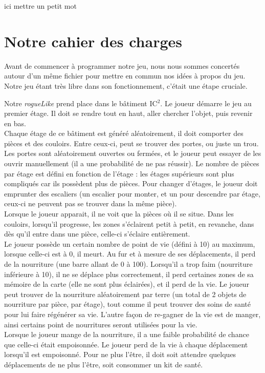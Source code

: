 \documentclass[11pt]{report}
\begin{document}
ici mettre un petit mot

	\section{Notre cahier des charges}

	Avant de commencer à programmer notre jeu, nous nous sommes concertés autour d'un même fichier pour mettre en commun nos idées à propos du jeu. Notre jeu étant très libre dans son fonctionnement, c'était une étape cruciale.
	
		\vspace{12pt}

	Notre \emph{rogueLike} prend place dans le bâtiment IC$^2$. Le joueur démarre le jeu au premier étage. Il doit se rendre tout en haut, aller chercher l'objet, puis revenir en bas.\\
	Chaque étage de ce bâtiment est généré aléatoirement, il doit comporter des pièces et des couloirs. Entre ceux-ci, peut se trouver des portes, ou juste un trou. Les portes sont aléatoirement ouvertes ou fermées, et le joueur peut essayer de les ouvrir manuellement (il a une probabilité de ne pas réussir). Le nombre de pièces par étage est défini en fonction de l'étage : les étages supérieurs sont plus compliqués car ils possèdent plus de pièces. Pour changer d'étages, le joueur doit emprunter des escaliers (un escalier pour monter, et un pour descendre par étage, ceux-ci ne peuvent pas se trouver dans la même pièce).\\
	Lorsque le joueur apparait, il ne voit que la pièces où il se situe. Dans les couloirs, lorsqu'il progresse, les zones s'éclairent petit à petit, en revanche, dans dès qu'il entre dans une pièce, celle-ci s'éclaire entièrement.\\
	Le joueur possède un certain nombre de point de vie (défini à 10) au maximum, lorsque celle-ci est à 0, il meurt. Au fur et à mesure de ses déplacements, il perd de la nourriture (une barre allant de 0 à 100). Lorsqu'il a trop faim (nourriture inférieure à 10), il ne se déplace plus correctement, il perd certaines zones de sa mémoire de la carte (elle ne sont plus éclairées), et il perd de la vie. Le joueur peut trouver de la nourriture aléatoirement par terre (un total de 2 objets de nourriture par pièce, par étage), tout comme il peut trouver des soins de santé pour lui faire régénérer sa vie. L'autre façon de re-gagner de la vie est de manger, ainsi certains point de nourritures seront utilisées pour la vie.\\
	Lorsque le joueur mange de la nourriture, il a une faible probabilité de chance que celle-ci était empoisonnée. Le joueur perd de la vie à chaque déplacement lorsqu'il est empoisonné. Pour ne plus l'être, il doit soit attendre quelques déplacements de ne plus l'être, soit consommer un kit de santé.\\
\end{document}
